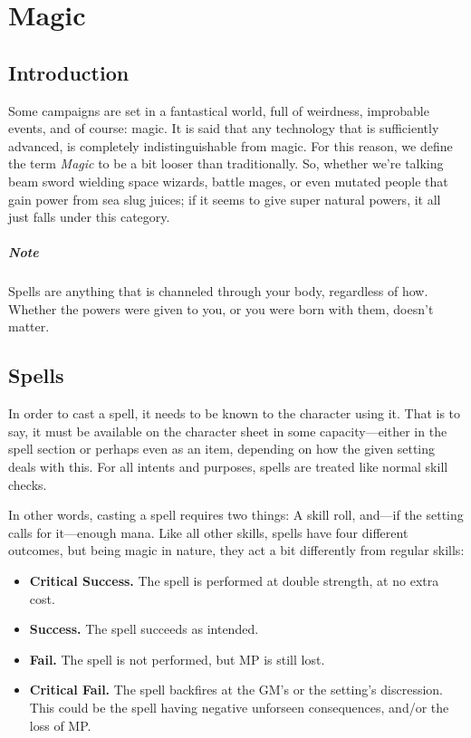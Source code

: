 \chapter{Magic} \label{chap:magic}
\section{Introduction}
Some campaigns are set in a fantastical world, full of weirdness, improbable events, and of course: magic.
It is said that any technology that is sufficiently advanced, is completely indistinguishable from magic.
For this reason, we define the term \textit{Magic} to be a bit looser than traditionally.
So, whether we're talking beam sword wielding space wizards, battle mages, or even mutated people that gain power from sea slug juices;
if it seems to give super natural powers, it all just falls under this category.

\paragraph{Note} Spells are anything that is channeled through your body, regardless of how.
Whether the powers were given to you, or you were born with them, doesn't matter.

\section{Spells}
In order to cast a spell, it needs to be known to the character using it.
That is to say, it must be available on the character sheet in some capacity---either in the spell section or perhaps even as an item, depending on how the given setting deals with this.
For all intents and purposes, spells are treated like normal skill checks.

In other words, casting a spell requires two things: A skill roll, and---if the setting calls for it---enough mana.
Like all other skills, spells have four different outcomes, but being magic in nature, they act a bit differently from regular skills:
\begin{itemize}
  \item \textbf{Critical Success.} The spell is performed at double strength, at no extra cost.
  \item \textbf{Success.} The spell succeeds as intended.
  \item \textbf{Fail.} The spell is not performed, but MP is still lost.
  \item \textbf{Critical Fail.} The spell backfires at the GM's or the setting's discression.
\\This could be the spell having negative unforseen consequences, and/or the loss of MP.
\end{itemize}

